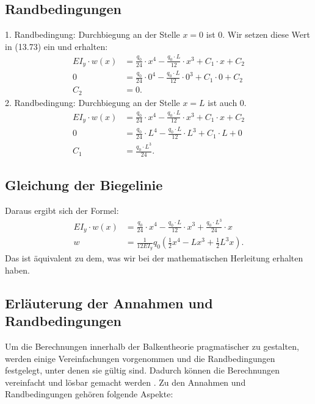 \subsection{Randbedingungen}
1. Randbedingung: Durchbiegung an der Stelle $x = 0$ ist 0. Wir setzen diese Wert in (13.73) ein und erhalten:
\begin{align}
		EI_y\cdot w\left(x\right)&=
		\frac{q_0}{24}\cdot x^4-\frac{q_0\cdot L}{12}\cdot x^3+C_1\cdot x+C_2
	\\
		0&=
		\frac{q_0}{24}\cdot0^4-\frac{q_0\cdot L}{12}\cdot0^3+C_1\cdot0+C_2
	\\
		C_2&=0.
\end{align}
2. Randbedingung: Durchbiegung an der Stelle $x = L$ ist auch 0.
\begin{align}
		EI_y\cdot w\left(x\right)&=
		\frac{q_0}{24}\cdot x^4-\frac{q_0\cdot L}{12}\cdot x^3+C_1\cdot x+C_2
	\\
		0&=
		\frac{q_0}{24}\cdot L^4-\frac{q_0\cdot L}{12}\cdot L^3+C_1\cdot L+0
	\\
		C_1&=
		\frac{q_0\cdot L^3}{24}.
\end{align}

\subsection{Gleichung der Biegelinie}
Daraus ergibt sich der Formel:
\begin{align}
		EI_y\cdot w\left(x\right)&=
		\frac{q_0}{24}\cdot x^4-\frac{q_0\cdot L}{12}\cdot x^3+\frac{q_0\cdot L^3}{24}\cdot x
	\\
		w&=
		\frac{1}{12EI_y}q_0\left(\frac{1}{2}x^4-Lx^3+\frac{1}{2}L^3x\right).
\end{align}
Das ist äquivalent zu dem, was wir bei der mathematischen Herleitung erhalten haben.

\subsection{Erläuterung der Annahmen und Randbedingungen}
Um die Berechnungen innerhalb der Balkentheorie pragmatischer zu gestalten, werden einige Vereinfachungen vorgenommen und die Randbedingungen festgelegt, unter denen sie gültig sind.
Dadurch können die Berechnungen vereinfacht und lösbar gemacht werden \cite{balken:Differentialgleichung-der-Biegelinie}.
Zu den Annahmen und Randbedingungen gehören folgende Aspekte:

